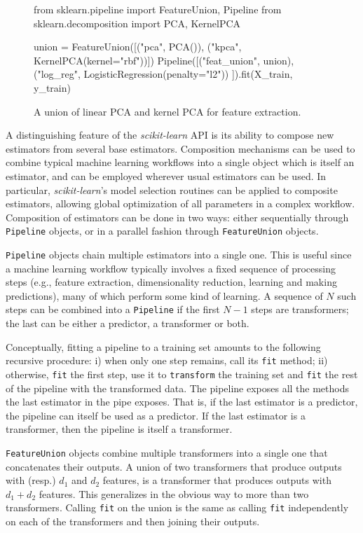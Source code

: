 \documentclass[twocolumn]{article}
\newcommand{\sklearn}{\textit{scikit-learn}\xspace}
\begin{document}
\begin{figure*}[t]
\begin{pythoncode}
from sklearn.pipeline import FeatureUnion, Pipeline
from sklearn.decomposition import PCA, KernelPCA

union = FeatureUnion([("pca", PCA()),
                      ("kpca", KernelPCA(kernel="rbf"))])
Pipeline([("feat_union", union),
          ("log_reg", LogisticRegression(penalty="l2"))
         ]).fit(X_train, y_train)
\end{pythoncode}
\caption{A union of linear PCA and kernel PCA for feature extraction.}
\label{pca-union}
\end{figure*}

A distinguishing feature of the \sklearn API is its ability to
compose new estimators from several base estimators. Composition mechanisms can
be used to combine typical machine learning workflows into a single object which
is itself an estimator, and can be employed wherever usual estimators can be used.
In particular, \sklearn's model selection routines
can be applied to composite estimators, allowing global optimization
of all parameters in a complex workflow.
Composition of estimators can be done in two
ways: either sequentially through \texttt{Pipeline} objects, or in a parallel
fashion through \texttt{FeatureUnion} objects.

\texttt{Pipeline} objects chain multiple estimators into a single one. This is
useful since a machine learning workflow typically involves a fixed sequence of
processing steps (e.g., feature extraction, dimensionality reduction, learning
and making predictions), many of which perform some kind of learning.
A sequence of $N$ such steps can be combined into a
\texttt{Pipeline} if the first $N-1$ steps are transformers; the last can be
either a predictor, a transformer or both.

Conceptually, fitting a pipeline to
a training set amounts to the following recursive procedure: i) when only one
step remains, call its \texttt{fit} method; ii) otherwise, \texttt{fit} the
first step, use it to \texttt{transform} the training set and \texttt{fit} the
rest of the pipeline with the transformed data. The pipeline exposes all the
methods the last estimator in the pipe exposes. That is, if the last estimator
is a predictor, the pipeline can itself be used as a predictor. If the last
estimator is a transformer, then the pipeline is itself a transformer.

\texttt{FeatureUnion} objects combine multiple transformers into a single one
that concatenates their outputs. A union of two transformers that
produce outputs with (resp.) $d_1$ and $d_2$ features, is
a transformer that produces outputs with $d_1 + d_2$ features.
This generalizes in the obvious way to more than two transformers.
Calling \texttt{fit} on the union is the same as calling \texttt{fit}
independently on each of the transformers and then joining their outputs.
\end{document}
